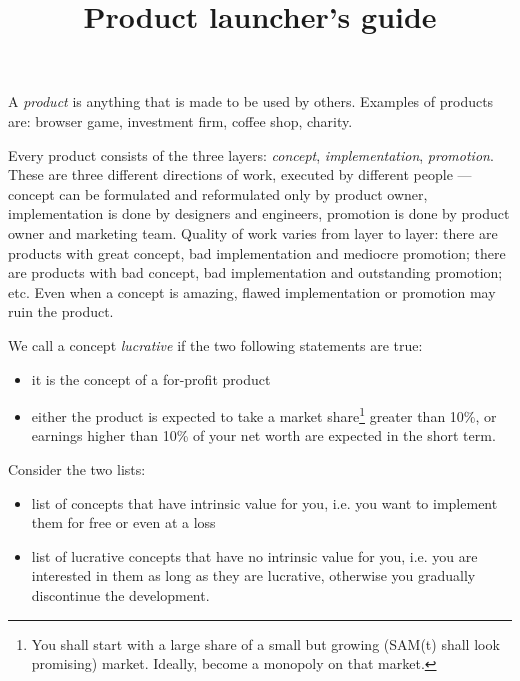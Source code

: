 \documentclass[11pt]{article}
\theoremstyle{remark}
\theoremstyle{definition}
\begin{document}
\baselineskip14pt
\bigskip




\title{Product launcher's guide}


\maketitle





A \textit{product} is anything that is made to be used by others. Examples of products are: browser game, investment firm, coffee shop, charity. 



Every product consists of the three layers: \textit{concept}, \textit{implementation}, \textit{promotion}. These are three different directions of work, executed by different people --- concept can be formulated and reformulated only by product owner, implementation is done by designers and engineers, promotion is done by product owner and marketing team. Quality of work varies from layer to layer: there are products with great concept, bad implementation and mediocre promotion; there are products with bad concept, bad implementation and outstanding promotion; etc. Even when a concept is amazing, flawed implementation or promotion may ruin the product.





We call a concept \textit{lucrative} if the two following statements are true: 

\begin{itemize}

\item it is the concept of a for-profit product

\item either the product is expected to take a market share\footnote{You shall start with a large share of a small but growing (SAM(t) shall look promising) market. Ideally, become a monopoly on that market.} greater than 10\%, or earnings higher than 10\% of your net worth are expected in the short term.


\end{itemize}

Consider the two lists:

\begin{itemize}

\item list of concepts that have intrinsic value for you, i.e. you want to implement them for free or even at a loss

\item list of lucrative concepts that have no intrinsic value for you, i.e. you are interested in them as long as they are lucrative, otherwise you gradually discontinue the development.

\end{itemize}
\end{document}
